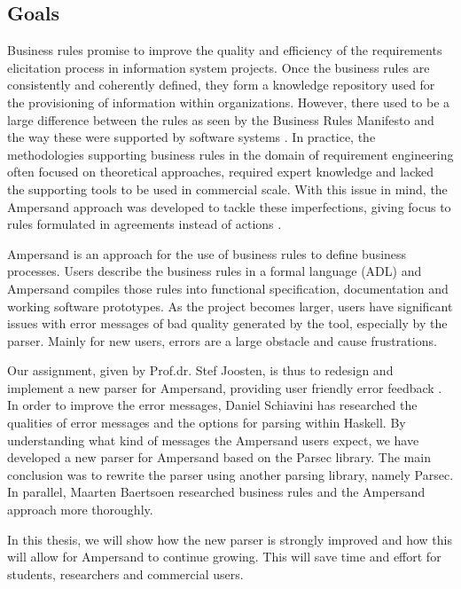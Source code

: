 
\subsection{Goals}
Business rules promise to improve the quality and efficiency of the requirements elicitation process in information system projects.
Once the business rules are consistently and coherently defined, they form a knowledge repository used for the provisioning of information within organizations.
However, there used to be a large difference between the rules as seen by the Business Rules Manifesto and the way these were supported by software systems .
In practice, the methodologies supporting business rules in the domain of requirement engineering often focused on theoretical approaches, required expert knowledge and lacked the supporting tools to be used in commercial scale.
With this issue in mind, the Ampersand approach was developed to tackle these imperfections, giving focus to rules formulated in agreements instead of actions .

Ampersand is an approach for the use of business rules to define business processes.
Users describe the business rules in a formal language (ADL) and Ampersand compiles those rules into functional specification, documentation and working software prototypes.
As the project becomes larger, users have significant issues with error messages of bad quality generated by the tool, especially by the parser.
Mainly for new users, errors are a large obstacle and cause frustrations.

Our assignment, given by Prof.dr. Stef Joosten, is thus to redesign and implement a new parser for Ampersand, providing user friendly error feedback .
In order to improve the error messages, Daniel Schiavini has researched the qualities of error messages and the options for parsing within Haskell.
By understanding what kind of messages the Ampersand users expect, we have developed a new parser for Ampersand based on the Parsec library.
The main conclusion was to rewrite the parser using another parsing library, namely Parsec.
In parallel, Maarten Baertsoen researched business rules and the Ampersand approach more thoroughly.

In this thesis, we will show how the new parser is strongly improved and how this will allow for Ampersand to continue growing.
This will save time and effort for students, researchers and commercial users.

